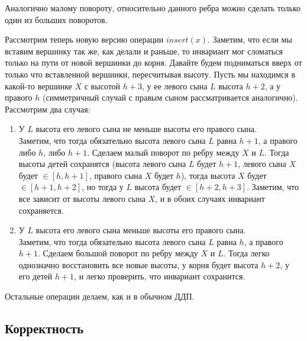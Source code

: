 \begin{note}
    Аналогично малому повороту, относительно данного ребра можно сделать только один из больших поворотов.
\end{note}

Рассмотрим теперь новую версию операции $insert(x)$. Заметим, что если мы вставим вершинку так же, как делали и раньше, то инвариант мог сломаться только на пути от новой вершинки до корня. Давайте будем подниматься вверх от только что вставленной вершинки, пересчитывая высоту. Пусть мы находимся в какой-то вершинке $X$ с высотой $h + 3$, у ее левого сына $L$ высота $h + 2$, а у правого $h$ (симметричный случай с правым сыном рассматривается аналогично). Рассмотрим два случая:
\begin{enumerate}
    \item У $L$ высота его левого сына не меньше высоты его правого сына. \\
    Заметим, что тогда обязательно высота левого сына $L$ равна $h+1$, а правого либо $h$, либо $h+1$. Сделаем малый поворот по ребру между $X$ и $L$. Тогда высоты детей сохранятся (высота левого сына $L$ будет $h+1$, левого сына $X$ будет $\in [h, h+1]$, правого сына $X$ будет $h$), тогда высота $X$ будет $\in [h+1, h+2]$, но тогда у $L$ высота будет $\in [h+2, h+3]$. Заметим, что все зависит от высоты левого сына $X$, и в обоих случаях инвариант сохраняется.
    \item У $L$ высота его левого сына меньше высоты его правого сына. \\
    Заметим, что тогда обязательно высота левого сына $L$ равна $h$, а правого $h+1$. Сделаем большой поворот по ребру между $X$ и $L$. Тогда легко однозначно восстановить все новые высоты, у корня будет высота $h+2$, у его детей $h+1$, и легко проверить, что инвариант сохранится.
\end{enumerate}

Остальные операции делаем, как и в обычном ДДП.



\subsection{Корректность}



